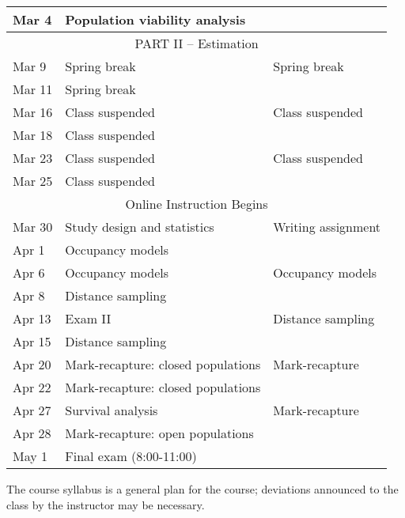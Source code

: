 \documentclass[12pt]{article}
\begin{document}
\begin{center}
\begin{tabular}[c]{lll}
Mar 4      & Population viability analysis      &                                   \\
\hline
           \multicolumn{3}{c}{PART II -- Estimation}                                \\
\hline
Mar 9      & Spring break                       & Spring break                      \\
Mar 11     & Spring break                       &                                   \\
\hline
Mar 16     & Class suspended                    & Class suspended                   \\
Mar 18     & Class suspended                    &                                   \\
\hline
Mar 23     & Class suspended                    & Class suspended                   \\
Mar 25     & Class suspended                    &                                   \\
\hline
           \multicolumn{3}{c}{Online Instruction Begins}                                \\
\hline
Mar 30     & Study design and statistics        & Writing assignment                \\
Apr 1      & Occupancy models                   &                                   \\
\hline
Apr 6      & Occupancy models                   & Occupancy models                  \\
Apr 8      & Distance sampling                  &                                   \\
\hline
Apr 13     & Exam II                            & Distance sampling                 \\
Apr 15     & Distance sampling                  &                                   \\
\hline
Apr 20     & Mark-recapture: closed populations & Mark-recapture                    \\
Apr 22     & Mark-recapture: closed populations &                                   \\
\hline
Apr 27     & Survival analysis                  & Mark-recapture                    \\
Apr 28     & Mark-recapture: open populations   &                                   \\
\hline
May 1      & Final exam (8:00-11:00)            &                                   \\
\hline \hline
\end{tabular}
\end{center}

The course syllabus is a general plan for the course; deviations announced to the class by the instructor may be necessary.
\end{document}

